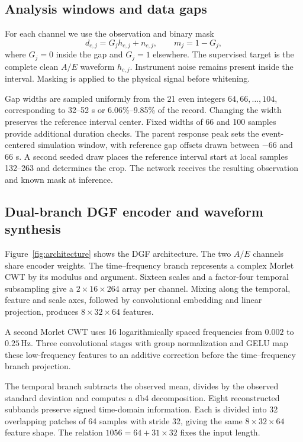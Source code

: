 \documentclass[10pt,prd,aps,a4paper,twocolumn,superscriptaddress,nofootinbib,floatfix]{revtex4-2}
\begin{document}
\subsection{Analysis windows and data gaps}\label{sec:gaps}
For each channel we use the observation and binary mask
\begin{equation}
d_{c,j}=G_jh_{c,j}+n_{c,j},\qquad m_j=1-G_j,\label{eq:observation}
\end{equation}
where $G_j=0$ inside the gap and $G_j=1$ elsewhere. The supervised target is the complete clean $A/E$ waveform $h_{c,j}$. Instrument noise remains present inside the interval. Masking is applied to the physical signal before whitening.

Gap widths are sampled uniformly from the 21 even integers $64,66,\ldots,104$, corresponding to 32--52 s or 6.06\%--9.85\% of the record. Changing the width preserves the reference interval center. Fixed widths of 66 and 100 samples provide additional duration checks. The parent response peak sets the event-centered simulation window, with reference gap offsets drawn between $-66$ and $66$ s. A second seeded draw places the reference interval start at local samples 132--263 and determines the crop. The network receives the resulting observation and known mask at inference.

\subsection{Dual-branch DGF encoder and waveform synthesis}\label{sec:architecture}
Figure~\ref{fig:architecture} shows the DGF architecture. The two $A/E$ channels share encoder weights. The time--frequency branch represents a complex Morlet CWT by its modulus and argument. Sixteen scales and a factor-four temporal subsampling give a $2\times16\times264$ array per channel. Mixing along the temporal, feature and scale axes, followed by convolutional embedding and linear projection, produces $8\times32\times64$ features.

A second Morlet CWT uses 16 logarithmically spaced frequencies from $0.002$ to $0.25\,\mathrm{Hz}$. Three convolutional stages with group normalization and GELU map these low-frequency features to an additive correction before the time--frequency branch projection.

The temporal branch subtracts the observed mean, divides by the observed standard deviation and computes a db4 decomposition. Eight reconstructed subbands preserve signed time-domain information. Each is divided into 32 overlapping patches of 64 samples with stride 32, giving the same $8\times32\times64$ feature shape. The relation $1056=64+31\times32$ fixes the input length.
\end{document}
